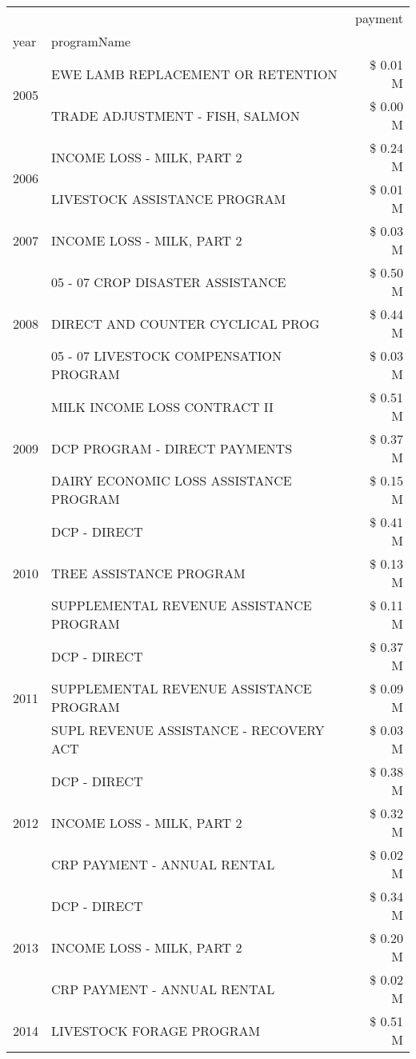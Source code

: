 \begin{tabular}{llr}
\toprule
 &  & payment \\
year & programName &  \\
\midrule
\multirow[t]{2}{*}{2005} & EWE LAMB REPLACEMENT OR RETENTION & \$ 0.01 M \\
 & TRADE ADJUSTMENT - FISH, SALMON & \$ 0.00 M \\
\cline{1-3}
\multirow[t]{2}{*}{2006} & INCOME LOSS - MILK, PART 2 & \$ 0.24 M \\
 & LIVESTOCK ASSISTANCE PROGRAM & \$ 0.01 M \\
\cline{1-3}
2007 & INCOME LOSS - MILK, PART 2 & \$ 0.03 M \\
\cline{1-3}
\multirow[t]{3}{*}{2008} & 05 - 07 CROP DISASTER ASSISTANCE & \$ 0.50 M \\
 & DIRECT AND COUNTER CYCLICAL PROG & \$ 0.44 M \\
 & 05 - 07 LIVESTOCK COMPENSATION PROGRAM & \$ 0.03 M \\
\cline{1-3}
\multirow[t]{3}{*}{2009} & MILK INCOME LOSS CONTRACT II & \$ 0.51 M \\
 & DCP PROGRAM - DIRECT PAYMENTS & \$ 0.37 M \\
 & DAIRY ECONOMIC LOSS ASSISTANCE PROGRAM & \$ 0.15 M \\
\cline{1-3}
\multirow[t]{3}{*}{2010} & DCP - DIRECT & \$ 0.41 M \\
 & TREE ASSISTANCE PROGRAM & \$ 0.13 M \\
 & SUPPLEMENTAL REVENUE ASSISTANCE PROGRAM & \$ 0.11 M \\
\cline{1-3}
\multirow[t]{3}{*}{2011} & DCP - DIRECT & \$ 0.37 M \\
 & SUPPLEMENTAL REVENUE ASSISTANCE PROGRAM & \$ 0.09 M \\
 & SUPL REVENUE ASSISTANCE - RECOVERY ACT & \$ 0.03 M \\
\cline{1-3}
\multirow[t]{3}{*}{2012} & DCP - DIRECT & \$ 0.38 M \\
 & INCOME LOSS - MILK, PART 2 & \$ 0.32 M \\
 & CRP PAYMENT - ANNUAL RENTAL & \$ 0.02 M \\
\cline{1-3}
\multirow[t]{3}{*}{2013} & DCP - DIRECT & \$ 0.34 M \\
 & INCOME LOSS - MILK, PART 2 & \$ 0.20 M \\
 & CRP PAYMENT - ANNUAL RENTAL & \$ 0.02 M \\
\cline{1-3}
\multirow[t]{3}{*}{2014} & LIVESTOCK FORAGE PROGRAM & \$ 0.51 M \\

\end{tabular}
